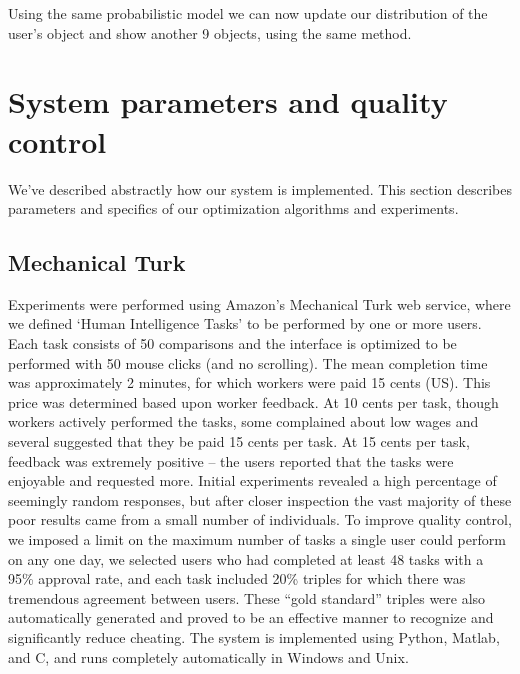 \documentclass{article}
\begin{document}
Using the same probabilistic model we can now update our distribution
of the user's object and show another 9 objects, using the same method.

\section{System parameters and quality control}\label{sec:params}
We've described abstractly how our system is implemented.  This
section describes parameters and specifics of our optimization
algorithms and experiments.

\subsection{Mechanical Turk}
Experiments were performed using Amazon's Mechanical Turk web service,
where we defined `Human Intelligence Tasks' to be performed by one or
more users.  Each task consists of 50 comparisons and the interface is
optimized to be performed with 50 mouse clicks (and no scrolling).
The mean completion time was approximately 2 minutes, for which
workers were paid 15 cents (US).  This price was determined based upon
worker feedback.  At 10 cents per task, though workers actively
performed the tasks, some complained about low wages and several
suggested that they be paid 15 cents per task.  At 15 cents per task,
feedback was extremely positive -- the users reported that the tasks
were enjoyable and requested more.  Initial experiments revealed a
high percentage of seemingly random responses, but after closer
inspection the vast majority of these poor results came from a small
number of individuals.  To improve quality control, we imposed a limit
on the maximum number of tasks a single user could perform on any one
day, we selected users who had completed at least 48 tasks with a 95\%
approval rate, and each task included 20\% triples for which there was
tremendous agreement between users.  These ``gold standard'' triples
were also automatically generated and proved to be an effective manner
to recognize and significantly reduce cheating.  The system is
implemented using Python, Matlab, and C, and runs completely
automatically in Windows and Unix.
\end{document}
